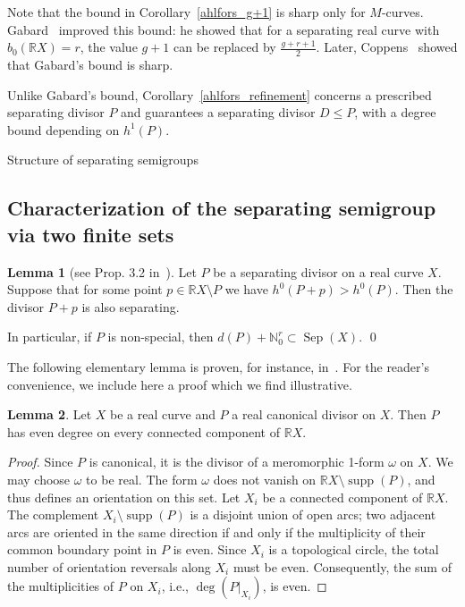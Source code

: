 \documentclass[x11names,oneside,11pt]{amsart}
\makeatletter
\theoremstyle{definition}
\newtheorem{lemma}{Lemma}
\theoremstyle{remark}
\DeclareMathOperator{\Sep}{Sep}
\DeclareMathOperator{\supp}{supp}
\newcommand{\N}{\mathbb{N}}
\newcommand{\R}{\mathbb{R}}
\renewcommand{\section}{%
  \@startsection{section}{1}%
    \z@{.7\linespacing\@plus\linespacing}{.5\linespacing}%
    {\normalfont\bfseries\centering}%
}
\makeatother
\begin{document}
  Note that the bound in Corollary~\ref{ahlfors_g+1} is sharp
  only for $M$-curves.
  Gabard~\cite{gabard_sur_2006} improved this bound:
  he showed that for a separating real curve with
  $b_0(\R X)=r$, the value $g+1$ can be replaced by
  $\frac{g+r+1}{2}$.
  Later, Coppens~\cite{coppens_separating_2013} showed that
  Gabard's bound is sharp.

  Unlike Gabard's bound, Corollary~\ref{ahlfors_refinement}
  concerns a prescribed separating divisor $P$ and guarantees
  a separating divisor $D\leqslant P$, with a degree bound
  depending on $h^1(P)$.
   

  \section{Structure of separating semigroups}\label{sep_structure}

  \subsection{Characterization of the separating semigroup via two finite sets}

  \begin{lemma}[see Prop. 3.2 in~\cite{kummer_separating_2020}]\label{KS_non_special}
    Let $P$ be a separating divisor on a real curve $X$. Suppose that for some point $p \in \R X \setminus P$ we have $h^0(P+p) > h^0(P)$. Then the divisor $P + p$ is also separating. 

    In particular, if $P$ is non-special, then $d(P) + \N_0^{r} \subset \Sep(X)$. \qed
  \end{lemma}

  The following elementary lemma is proven, for instance, in~\cite[Prop. 2.1]{huisman_non-special_2003}. For the reader's convenience, we include here a proof which we find illustrative.   
    
  \begin{lemma}\label{canonical_even_degree}
  Let $X$ be a real curve and $P$ a real canonical divisor on $X$. Then $P$ has even degree on every connected component of $\R X$.
  \end{lemma}
    \begin{proof}
       Since $P$ is canonical, it is the divisor of a meromorphic 1-form $\omega$ on $X$. We may choose $\omega$ to be real. The form $\omega$ does not vanish on $\R X \setminus \supp(P)$, and thus defines an orientation on this set. Let $X_i$ be a connected component of $\R X$.  The complement $X_i \setminus \supp(P)$ is a disjoint union of open arcs; two adjacent arcs are oriented in the same direction if and only if the multiplicity of their common boundary point in $P$ is even.  Since $X_i$ is a topological circle, the total number of orientation reversals along $X_i$ must be even. Consequently, the sum of the multiplicities of $P$ on $X_i$, i.e., $\deg(P|_{X_i})$, is even.
  \end{proof}
\end{document}

